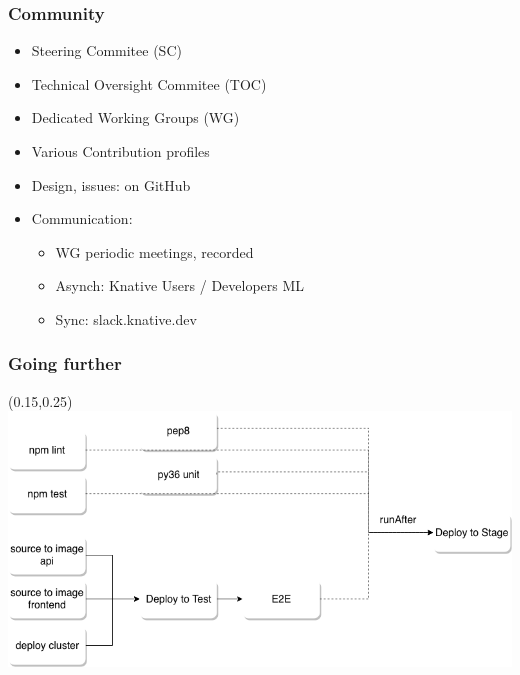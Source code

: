 \documentclass[aspectratio=169,11pt,hyperref={colorlinks=true}]{beamer}
\begin{document}
\begin{lblackrwhiteframe}
\begin{grayframe}
  \frametitle{Community}
  \begin{itemize}
    \item Steering Commitee (SC)
    \item Technical Oversight Commitee (TOC)
    \item Dedicated Working Groups (WG)
    \item Various Contribution profiles
    \item Design, issues: on GitHub
    \item Communication:
    \begin{itemize}
      \item WG periodic meetings, recorded
      \item Asynch: Knative Users / Developers ML
      \item Sync: slack.knative.dev
    \end{itemize}
  \end{itemize}
\end{grayframe}

\begin{tblackbgrayframe}
  \frametitle{Going further}
  \begin{textblock*}{0.75\paperwidth}(0.15\paperwidth,0.25\paperheight)
    \includegraphics[width=0.75\paperwidth]{img/test-pipeline.png}
  \end{textblock*}
\end{tblackbgrayframe}


\end{lblackrwhiteframe}
\end{document}
